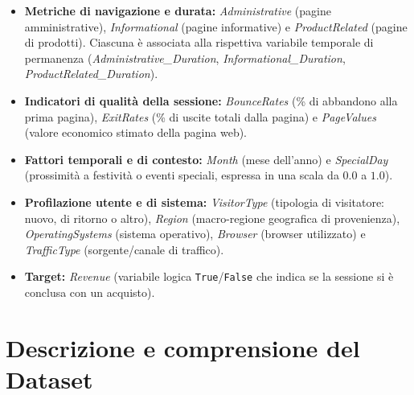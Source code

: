 \documentclass[11pt,a4paper]{article}
\begin{document}
\begin{itemize}
    \item \textbf{Metriche di navigazione e durata:} \textit{Administrative} (pagine amministrative), \textit{Informational} (pagine informative) e \textit{ProductRelated} (pagine di prodotti). Ciascuna è associata alla rispettiva variabile temporale di permanenza (\textit{Administrative\_Duration}, \textit{Informational\_Duration}, \textit{ProductRelated\_Duration}).
    
    \item \textbf{Indicatori di qualità della sessione:} \textit{BounceRates} (\% di abbandono alla prima pagina), \textit{ExitRates} (\% di uscite totali dalla pagina) e \textit{PageValues} (valore economico stimato della pagina web).
    
    \item \textbf{Fattori temporali e di contesto:} \textit{Month} (mese dell'anno) e \textit{SpecialDay} (prossimità a festività o eventi speciali, espressa in una scala da $0.0$ a $1.0$).
    
    \item \textbf{Profilazione utente e di sistema:} \textit{VisitorType} (tipologia di visitatore: nuovo, di ritorno o altro), \textit{Region} (macro-regione geografica di provenienza), \textit{OperatingSystems} (sistema operativo), \textit{Browser} (browser utilizzato) e \textit{TrafficType} (sorgente/canale di traffico).
    
    \item \textbf{Target:} \textit{Revenue} (variabile logica \texttt{True}/\texttt{False} che indica se la sessione si è conclusa con un acquisto).
\end{itemize}



\section{Descrizione e comprensione del Dataset}
\label{sec: Descrizione}
\end{document}
